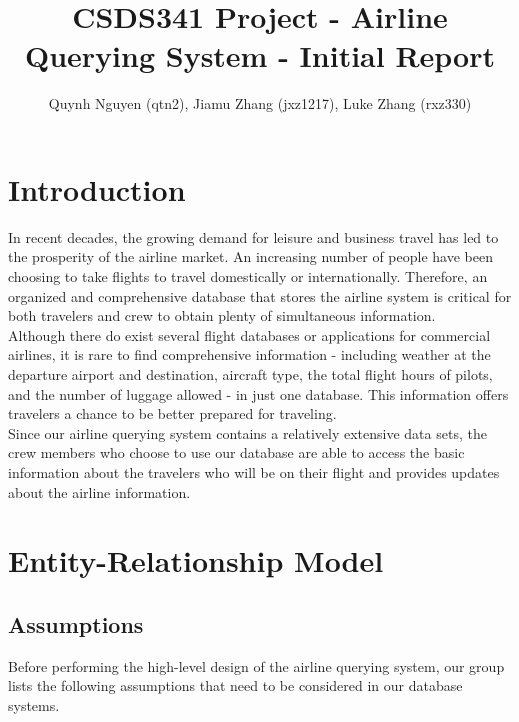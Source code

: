 \documentclass{article}
\title{CSDS341 Project - Airline Querying System - Initial Report}
\author{Quynh Nguyen (qtn2), Jiamu Zhang (jxz1217), Luke Zhang (rxz330)}
\begin{document}
	
	
	\maketitle
	
	\section{Introduction}
	
	\noindent In recent decades, the growing demand for leisure and business travel has led to the prosperity of the airline market. An increasing number of people have been choosing to take flights to travel domestically or internationally. Therefore, an organized and comprehensive database that stores the airline system is critical for both travelers and crew to obtain plenty of simultaneous information.\\
	
	\noindent Although there do exist several flight databases or applications for commercial airlines, it is rare to find comprehensive information - including weather at the departure airport and destination, aircraft type, the total flight hours of pilots, and the number of luggage allowed - in just one database. This information offers travelers a chance to be better prepared for traveling.\\
	
	\noindent Since our airline querying system contains a relatively extensive data sets, the crew members who choose to use our database are able to access the basic information about the travelers who will be on their flight and provides updates about the airline information. 	
	
	\section{Entity-Relationship Model}
	
	\subsection{Assumptions}
	{Before performing the high-level design of the airline querying system, our group lists the following assumptions that need to be considered in our database systems.}
	
\end{document}
